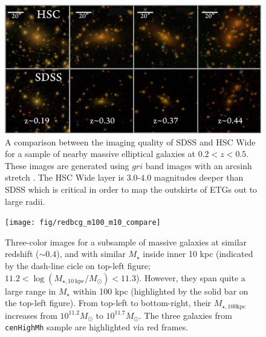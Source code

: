 \documentclass{emulateapj}
\def\rbcg{\texttt{cenHighMh}}
\def\mstar{{$M_{\star}$}}
\def\mtot{{$M_{\star,100\mathrm{kpc}}$}}
\begin{document}
\begin{CJK*}{UTF8}{gbsn}
    \begin{figure}[t!]
        \centering 
        \includegraphics[width=\textwidth]{fig/redbcg_sdss_compare}
        \caption{A comparison between the imaging quality of SDSS and HSC Wide for a sample 
        	of nearby massive elliptical galaxies at $0.2 < z < 0.5$.  
            These images are generated using $gri$ band images with an arcsinh stretch 
            \citep{Lupton2004}. 
            The HSC Wide layer is $3.0$-$4.0$ magnitudes deeper than SDSS which is 
            critical in order to map the outskirts of ETGs out to large radii.}
        \label{fig:sdss_compare}
    \end{figure}

  \begin{figure}[t!]
      \centering 
      \texttt{[image: fig/redbcg\_m100\_m10\_compare]}
      \caption{Three-color images for a subsample of massive galaxies at similar redshift
      		($\sim 0.4$), and with similar \mstar{} inside inner 10 kpc (indicated by the 
            dash-line cicle on top-left figure; 
            $11.2<\log (M_{\star,10\ \mathrm{kpc}}/M_{\odot})<11.3$). 
            However, they span quite a large range in \mstar{} within 100 kpc 
            (highlighted by the solid bar on the top-left figure). 
            From top-left to bottom-right, their \mtot{} increases from 
            $10^{11.2} M_{\odot}$ to $10^{11.7} M_{\odot}$.
            The three galaxies from \rbcg{} sample are highlighted via red frames.
            }
      \label{fig:m100_m10_color}
  \end{figure}


\end{CJK*}
\end{document}
